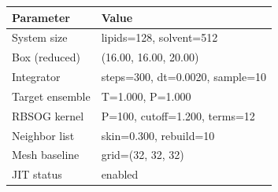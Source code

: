 \begin{tabular}{ll}
\toprule
Parameter & Value \\
\midrule
System size & lipids=128, solvent=512 \\
Box (reduced) & (16.00, 16.00, 20.00) \\
Integrator & steps=300, dt=0.0020, sample=10 \\
Target ensemble & T=1.000, P=1.000 \\
RBSOG kernel & P=100, cutoff=1.200, terms=12 \\
Neighbor list & skin=0.300, rebuild=10 \\
Mesh baseline & grid=(32, 32, 32) \\
JIT status & enabled \\
\bottomrule
\end{tabular}
